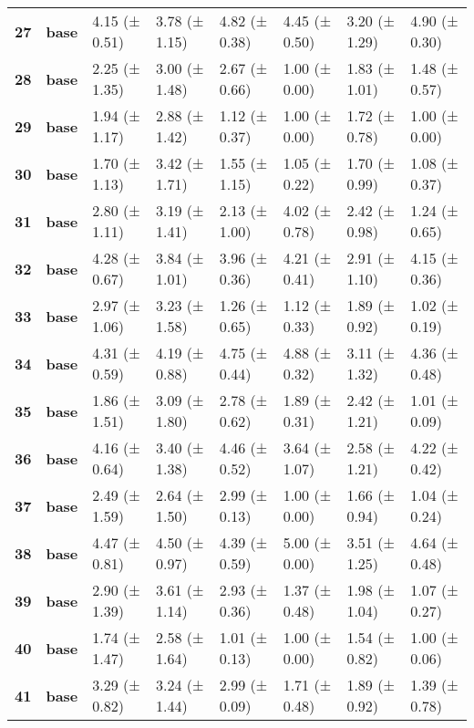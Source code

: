 \begin{longtable}{llllllll}
\cline{1-8}
\textbf{27} & \textbf{base} & 4.15 (± 0.51) & 3.78 (± 1.15) & 4.82 (± 0.38) & 4.45 (± 0.50) & 3.20 (± 1.29) & 4.90 (± 0.30) \\
\cline{1-8}
\textbf{28} & \textbf{base} & 2.25 (± 1.35) & 3.00 (± 1.48) & 2.67 (± 0.66) & 1.00 (± 0.00) & 1.83 (± 1.01) & 1.48 (± 0.57) \\
\cline{1-8}
\textbf{29} & \textbf{base} & 1.94 (± 1.17) & 2.88 (± 1.42) & 1.12 (± 0.37) & 1.00 (± 0.00) & 1.72 (± 0.78) & 1.00 (± 0.00) \\
\cline{1-8}
\textbf{30} & \textbf{base} & 1.70 (± 1.13) & 3.42 (± 1.71) & 1.55 (± 1.15) & 1.05 (± 0.22) & 1.70 (± 0.99) & 1.08 (± 0.37) \\
\cline{1-8}
\textbf{31} & \textbf{base} & 2.80 (± 1.11) & 3.19 (± 1.41) & 2.13 (± 1.00) & 4.02 (± 0.78) & 2.42 (± 0.98) & 1.24 (± 0.65) \\
\cline{1-8}
\textbf{32} & \textbf{base} & 4.28 (± 0.67) & 3.84 (± 1.01) & 3.96 (± 0.36) & 4.21 (± 0.41) & 2.91 (± 1.10) & 4.15 (± 0.36) \\
\cline{1-8}
\textbf{33} & \textbf{base} & 2.97 (± 1.06) & 3.23 (± 1.58) & 1.26 (± 0.65) & 1.12 (± 0.33) & 1.89 (± 0.92) & 1.02 (± 0.19) \\
\cline{1-8}
\textbf{34} & \textbf{base} & 4.31 (± 0.59) & 4.19 (± 0.88) & 4.75 (± 0.44) & 4.88 (± 0.32) & 3.11 (± 1.32) & 4.36 (± 0.48) \\
\cline{1-8}
\textbf{35} & \textbf{base} & 1.86 (± 1.51) & 3.09 (± 1.80) & 2.78 (± 0.62) & 1.89 (± 0.31) & 2.42 (± 1.21) & 1.01 (± 0.09) \\
\cline{1-8}
\textbf{36} & \textbf{base} & 4.16 (± 0.64) & 3.40 (± 1.38) & 4.46 (± 0.52) & 3.64 (± 1.07) & 2.58 (± 1.21) & 4.22 (± 0.42) \\
\cline{1-8}
\textbf{37} & \textbf{base} & 2.49 (± 1.59) & 2.64 (± 1.50) & 2.99 (± 0.13) & 1.00 (± 0.00) & 1.66 (± 0.94) & 1.04 (± 0.24) \\
\cline{1-8}
\textbf{38} & \textbf{base} & 4.47 (± 0.81) & 4.50 (± 0.97) & 4.39 (± 0.59) & 5.00 (± 0.00) & 3.51 (± 1.25) & 4.64 (± 0.48) \\
\cline{1-8}
\textbf{39} & \textbf{base} & 2.90 (± 1.39) & 3.61 (± 1.14) & 2.93 (± 0.36) & 1.37 (± 0.48) & 1.98 (± 1.04) & 1.07 (± 0.27) \\
\cline{1-8}
\textbf{40} & \textbf{base} & 1.74 (± 1.47) & 2.58 (± 1.64) & 1.01 (± 0.13) & 1.00 (± 0.00) & 1.54 (± 0.82) & 1.00 (± 0.06) \\
\cline{1-8}
\textbf{41} & \textbf{base} & 3.29 (± 0.82) & 3.24 (± 1.44) & 2.99 (± 0.09) & 1.71 (± 0.48) & 1.89 (± 0.92) & 1.39 (± 0.78) \\

\end{longtable}
